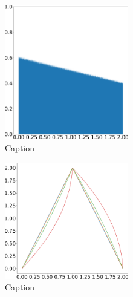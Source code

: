 \begin{figure}[H]
    \includegraphics[width=0.48\textwidth]{figure/tent_pinched_physical_density_0.2.png}
    \caption{Caption}
    \label{fig:tent_pinched_shadow}
\end{figure}

\begin{figure}[H]
    \centering
    \includegraphics[width=0.48\textwidth]{figure/wave_tent_map.png}
    \caption{Caption}
    \label{fig:tent_wave}
\end{figure}

